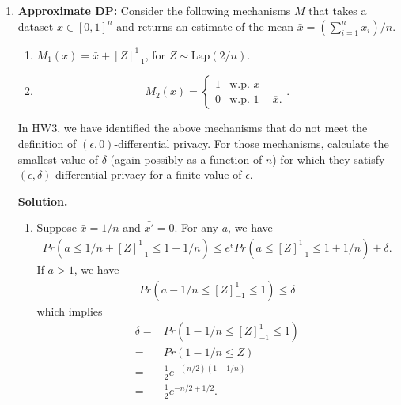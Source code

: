 \documentclass[12pt]{article}
\begin{document}
\begin{enumerate}
\item \textbf{Approximate DP:} Consider the following mechanisms $M$ that takes a dataset $x\in [0,1]^n$ and returns
an estimate of the mean $\bar{x} = (\sum_{i=1}^n x_i)/n$.

\begin{enumerate}[(M1)]
    \item $M_1(x) = \bar{x}+[Z]^1_{-1}$, for $Z\sim \mathrm{Lap}(2/n)$.
    \item 
    $$M_2(x) = \begin{cases} 1 & \text{w.p. } \overline{x}\\
    0 & \text{w.p. } 1-\overline{x}.
    \end{cases}.$$
    
\end{enumerate}

In HW3, we have identified the above mechanisms that do not meet the definition of $(\epsilon,0)$-differential privacy.
For those mechanisms, calculate the smallest value of $\delta$ (again possibly as a function of $n$) 
for which they satisfy $(\epsilon,\delta)$ differential privacy for a finite value of $\epsilon$.

\begin{solution}
\textbf{Solution.}\\
\begin{enumerate}
    \item 
    Suppose $\bar{x} = 1/n$ and $\bar{x'}=0$.
    For any $a$, we have 
    \begin{align*}
        Pr(a\leq 1/n+[Z]_{-1}^1\leq 1+1/n) \leq e^\epsilon Pr(a\leq [Z]_{-1}^1\leq 1+1/n) + \delta.
    \end{align*}
    If $a>1$, we have
    \begin{align*}
        Pr(a-1/n\leq [Z]_{-1}^1\leq 1) \leq \delta
    \end{align*}
    which implies
    \begin{align*}
        \delta =& Pr(1-1/n \leq [Z]_{-1}^1 \leq 1)\\
        =& Pr(1-1/n\leq Z)\\
        =& \frac{1}{2} e^{-(n/2)(1-1/n)}\\
        =&\frac{1}{2} e^{-n/2+1/2}.
    \end{align*}


\end{enumerate}
\end{solution}
\end{enumerate}
\end{document}
